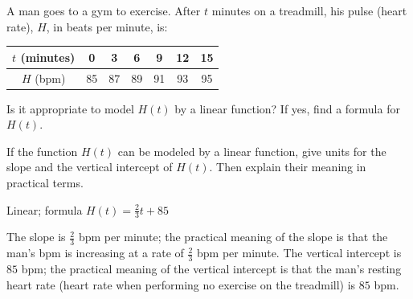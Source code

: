 \begin{exercise}
    A man goes to a gym to exercise. After $t$ minutes on a treadmill, his pulse (heart rate), $H$, in beats per minute, is: 

\begin{center}
\begin{tabular}{|c|c|c|c|c|c|c|}
\hline $t$ (minutes) & 0 & 3 & 6 & 9 & 12 & 15 
\\\hline $H$ (bpm) & 85 & 87 & 89 & 91 & 93 & 95
\\\hline
\end{tabular}
\end{center}

\begin{parts}
    \item Is it appropriate to model $H(t)$ by a linear function? If yes, find a formula for $H(t)$.
    
    \item If the function $H(t)$ can be modeled by a linear function, give units for the slope and the vertical intercept of $H(t)$. Then explain their meaning in practical terms.
\end{parts}
\end{exercise}

\begin{solution}
    \begin{parts}
        \item Linear; formula $H(t)=\frac{2}{3}t+85$

        \item The slope is $\frac{2}{3}$ bpm per minute; the practical meaning of the slope is that the man's bpm is increasing at a rate of $\frac{2}{3}$ bpm per minute. The vertical intercept is $85$ bpm; the practical meaning of the vertical intercept is that the man's resting heart rate (heart rate when performing no exercise on the treadmill) is $85$ bpm.
    \end{parts}
\end{solution}